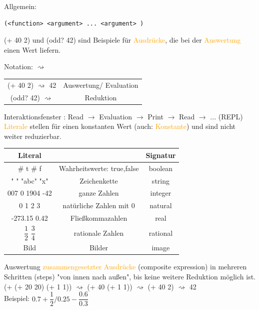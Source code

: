 \documentclass[paper=a4, fontsize=11pt]{scrartcl}
\numberwithin{equation}{section}
\numberwithin{figure}{section}
\numberwithin{table}{section}
\begin{document}
Allgemein:
\begin{lstlisting}
(<function> <argument> ... <argument> )
\end{lstlisting}

(+ 40 2) und (odd? 42) sind Beispiele für \textcolor{orange}{Ausdrücke}, die bei der \textcolor{orange}{Auswertung} einen Wert liefern.

Notation: $\rightsquigarrow$ \\
\begin{tabular}{cc}
(+ 40 2) $\rightsquigarrow$ 42 & Auswertung/ Evaluation \\
(odd? 42) $\rightsquigarrow$ & Reduktion \\
\end{tabular}

Interaktionsfenster : Read $\rightarrow$ Evaluation $\rightarrow$ Print $\rightarrow$ Read $\rightarrow$ ... (REPL) \\

\textcolor{orange}{Literale} stellen für einen konstanten Wert (auch: \textcolor{orange}{Konstante}) und sind nicht weiter reduzierbar. \\
\begin{tabular}{cc|c}
Literal & & Signatur \\\hline
\# t \# f & Wahrheitswerte: true,false & boolean \\
" " "abc" "x" & Zeichenkette & string \\
007 0 1904 -42 & ganze Zahlen & integer \\
0 1 2 3 & natürliche Zahlen mit 0 & natural \\
-273.15 0.42 & Fließkommazahlen & real \\
$\dfrac{1}{2}$ $\dfrac{3}{4}$ & rationale Zahlen & rational \\
Bild & Bilder & image \\
\end{tabular}

Auswertung \textcolor{orange}{zusammengesetzter Ausdrücke} (composite expression) in mehreren Schritten (steps) "von innen nach außen", bis keine weitere Reduktion möglich ist. \\

(+ (+ 20 20) (+ 1 1)) $\rightsquigarrow$ (+ 40 (+ 1 1)) $\rightsquigarrow$ (+ 40 2) $\rightsquigarrow$ 42 \\

Beispiel: $0.7 + \dfrac{1}{2} / 0.25 - \dfrac{0.6}{0.3}$ \\
\end{document}

